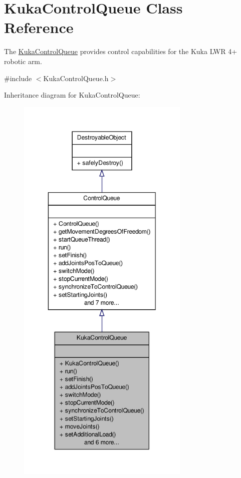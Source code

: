 \hypertarget{classKukaControlQueue}{\section{\-Kuka\-Control\-Queue \-Class \-Reference}
\label{classKukaControlQueue}
}


\-The \hyperlink{classKukaControlQueue}{\-Kuka\-Control\-Queue} provides control capabilities for the \-Kuka \-L\-W\-R 4+ robotic arm.  




{\ttfamily \#include $<$\-Kuka\-Control\-Queue.\-h$>$}



\-Inheritance diagram for \-Kuka\-Control\-Queue\-:\nopagebreak
\begin{figure}[H]
\begin{center}
\leavevmode
\includegraphics[height=550pt]{classKukaControlQueue__inherit__graph}
\end{center}
\end{figure}


